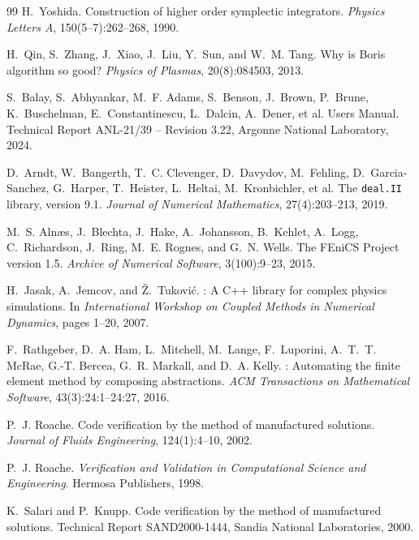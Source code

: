 \documentclass[11pt,a4paper]{article}
\begin{document}
\begin{thebibliography}{99}
H.~Yoshida.
\newblock Construction of higher order symplectic integrators.
\newblock \emph{Physics Letters A}, 150(5--7):262--268, 1990.

H.~Qin, S.~Zhang, J.~Xiao, J.~Liu, Y.~Sun, and W.~M. Tang.
\newblock Why is {Boris} algorithm so good?
\newblock \emph{Physics of Plasmas}, 20(8):084503, 2013.

S.~Balay, S.~Abhyankar, M.~F. Adams, S.~Benson, J.~Brown, P.~Brune, K.~Buschelman, E.~Constantinescu, L.~Dalcin, A.~Dener, et al.
 Users Manual.
\newblock Technical Report ANL-21/39 -- Revision 3.22, Argonne National Laboratory, 2024.

D.~Arndt, W.~Bangerth, T.~C. Clevenger, D.~Davydov, M.~Fehling, D.~Garcia-Sanchez, G.~Harper, T.~Heister, L.~Heltai, M.~Kronbichler, et al.
\newblock The \texttt{deal.II} library, version 9.1.
\newblock \emph{Journal of Numerical Mathematics}, 27(4):203--213, 2019.

M.~S. Aln{\ae}s, J.~Blechta, J.~Hake, A.~Johansson, B.~Kehlet, A.~Logg, C.~Richardson, J.~Ring, M.~E. Rognes, and G.~N. Wells.
\newblock The {FEniCS} Project version 1.5.
\newblock \emph{Archive of Numerical Software}, 3(100):9--23, 2015.

H.~Jasak, A.~Jemcov, and \v{Z}.~Tukovi\'{c}.
: A {C++} library for complex physics simulations.
\newblock In \emph{International Workshop on Coupled Methods in Numerical Dynamics}, pages 1--20, 2007.

F.~Rathgeber, D.~A. Ham, L.~Mitchell, M.~Lange, F.~Luporini, A.~T.~T. McRae, G.-T. Bercea, G.~R. Markall, and D.~A. Kelly.
: Automating the finite element method by composing abstractions.
\newblock \emph{ACM Transactions on Mathematical Software}, 43(3):24:1--24:27, 2016.

P.~J. Roache.
\newblock Code verification by the method of manufactured solutions.
\newblock \emph{Journal of Fluids Engineering}, 124(1):4--10, 2002.

P.~J. Roache.
\newblock \emph{Verification and Validation in Computational Science and Engineering}.
\newblock Hermosa Publishers, 1998.

K.~Salari and P.~Knupp.
\newblock Code verification by the method of manufactured solutions.
\newblock Technical Report SAND2000-1444, Sandia National Laboratories, 2000.


\end{thebibliography}
\end{document}
